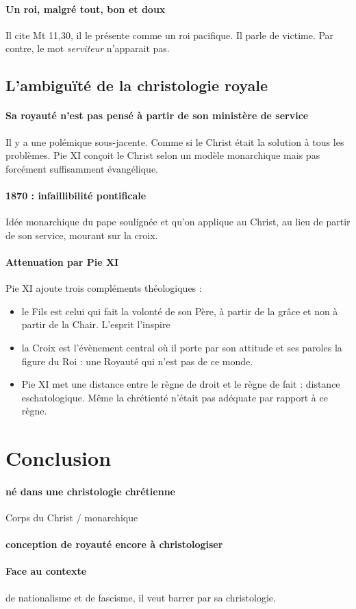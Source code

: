 \paragraph{Un roi, malgré tout, bon et doux}
Il cite Mt 11,30, il le présente comme un roi pacifique. Il parle de victime. Par contre, le mot \textit{serviteur} n'apparait pas.

\subsection{L’ambiguïté de la christologie royale }
 
 \paragraph{Sa royauté n'est pas pensé à partir de son ministère de service} Il y a une polémique sous-jacente. Comme si le Christ était la solution à tous les problèmes. Pie XI conçoit le Christ selon un modèle monarchique mais pas forcément suffisamment évangélique.
 
 \paragraph{1870 : infaillibilité pontificale} Idée monarchique du pape soulignée et qu'on applique au Christ, au lieu de partir de son service, mourant sur la croix.
 
 \paragraph{Attenuation par Pie XI} Pie XI ajoute trois compléments théologiques :
 \begin{itemize}
     \item le Fils est celui qui fait la volonté de son Père, à partir de la grâce et non à partir de la Chair. L'esprit l'inspire
     \item la Croix est l'évènement central où il porte par son attitude et ses paroles la figure du Roi : une Royauté qui n'est pas de ce monde.
     \item Pie XI met une distance entre le règne de droit et le règne de fait : distance eschatologique. Même la chrétienté n'était pas adéquate par rapport à ce règne.
 \end{itemize}
 

\section{Conclusion } 

\paragraph{né dans une christologie chrétienne} Corps du Christ / monarchique

\paragraph{conception de royauté encore à christologiser}

\paragraph{Face au contexte} de nationalisme et de fascisme, il veut barrer par sa christologie.